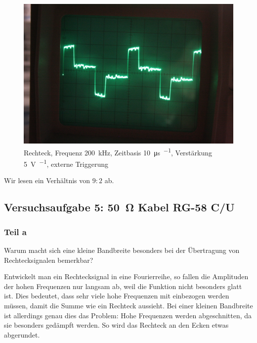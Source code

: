 \begin{figure}
	\centering
	\begin{minipage}{.45\linewidth}
	\end{minipage}
	\hfill
	\begin{minipage}{.45\linewidth}
	\includegraphics[width=\linewidth]{Fotos/IMG_0775-1500.jpg}
	\end{minipage}
	\caption{%
		Rechteck, Frequenz \SI{200}{\kilo\hertz},
		Zeitbasis \SI{10}{\micro\second\per\division},
		Verstärkung \SI{5}{\volt\per\division},
		externe Triggerung
	}
	\label{fig:0775}
\end{figure}

Wir lesen ein Verhältnis von $9 : 2$ ab.

\FloatBarrier
\subsection{Versuchsaufgabe 5: \SI{50}{\ohm} Kabel RG-58 C/U}

\subsubsection{Teil a}

\begin{problem}
	Warum macht sich eine kleine Bandbreite besonders bei der Übertragung von
	Rechtecksignalen bemerkbar?
\end{problem}

Entwickelt man ein Rechtecksignal in eine Fourierreihe, so fallen die
Amplituden der hohen Frequenzen nur langsam ab, weil die Funktion nicht
besonders glatt ist. Dies bedeutet, dass sehr viele hohe Frequenzen mit
einbezogen werden müssen, damit die Summe wie ein Rechteck aussieht. Bei einer
kleinen Bandbreite ist allerdings genau dies das Problem: Hohe Frequenzen
werden abgeschnitten, da sie besonders gedämpft werden. So wird das Rechteck an
den Ecken etwas abgerundet.

